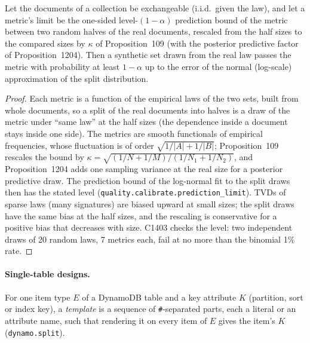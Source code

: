 \begin{proposition}\label{prop:doclimits}
Let the documents of a collection be exchangeable (i.i.d.\ given the law), and let a metric's limit be the
one-sided level-$(1-\alpha)$ prediction bound of the metric between two random halves of the real documents,
rescaled from the half sizes to the compared sizes by $\kappa$ of Proposition~109 (with the posterior predictive
factor of Proposition~1204). Then a synthetic set drawn from the real law passes the metric with probability at
least $1-\alpha$ up to the error of the normal (log-scale) approximation of the split distribution.
\end{proposition}
\begin{proof}
Each metric is a function of the empirical laws of the two sets, built from whole documents, so a split of the real
documents into halves is a draw of the metric under ``same law'' at the half sizes (the dependence inside a
document stays inside one side). The metrics are smooth functionals of empirical frequencies, whose fluctuation is
of order $\sqrt{1/|A|+1/|B|}$; Proposition~109 rescales the bound by
$\kappa=\sqrt{(1/N+1/M)/(1/N_1+1/N_2)}$, and Proposition~1204 adds one sampling variance at the real size for a
posterior predictive draw. The prediction bound of the log-normal fit to the split draws then has the stated level
(\texttt{quality.calibrate.prediction\_limit}). TVDs of sparse laws (many signatures) are biased upward at small
sizes; the split draws have the same bias at the half sizes, and the rescaling is conservative for a positive bias
that decreases with size. C1403 checks the level: two independent draws of 20 random laws, 7 metrics each, fail at
no more than the binomial 1\% rate.
\end{proof}

\paragraph{Single-table designs.} For one item type $E$ of a DynamoDB table and a key attribute $K$ (partition, sort
or index key), a \emph{template} is a sequence of \texttt{\#}-separated parts, each a literal or an attribute name,
such that rendering it on every item of $E$ gives the item's $K$ (\texttt{dynamo.split}).

